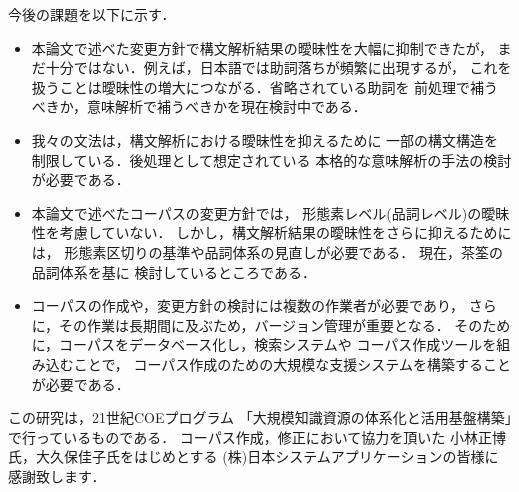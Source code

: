 今後の課題を以下に示す．
\begin{itemize}
\item 本論文で述べた変更方針で構文解析結果の曖昧性を大幅に抑制できたが，
  まだ十分ではない．例えば，日本語では助詞落ちが頻繁に出現するが，
  これを扱うことは曖昧性の増大につながる．省略されている助詞を
  前処理で補うべきか，意味解析で補うべきかを現在検討中である．
\item 我々の文法は，構文解析における曖昧性を抑えるために
  一部の構文構造を制限している．後処理として想定されている
  本格的な意味解析の手法の検討が必要である．
\item 本論文で述べたコーパスの変更方針では，
  形態素レベル(品詞レベル)の曖昧性を考慮していない．
  しかし，構文解析結果の曖昧性をさらに抑えるためには，
  形態素区切りの基準や品詞体系の見直しが必要である．
  現在，茶筌\cite{matsumoto:2003}の品詞体系を基に
  検討しているところである．
\item コーパスの作成や，変更方針の検討には複数の作業者が必要であり，
  さらに，その作業は長期間に及ぶため，バージョン管理が重要となる．
  そのために，コーパスをデータベース化し，検索システムや
  コーパス作成ツールを組み込むことで，
  コーパス作成のための大規模な支援システムを構築することが必要である．
\end{itemize}

\acknowledgment

この研究は，21世紀COEプログラム
「大規模知識資源の体系化と活用基盤構築」で行っているものである．
コーパス作成，修正において協力を頂いた
小林正博氏，大久保佳子氏をはじめとする
(株)日本システムアプリケーションの皆様に感謝致します．


